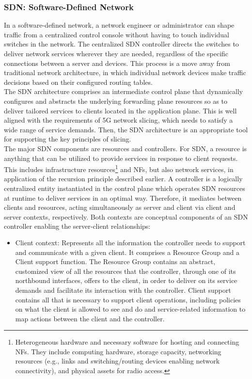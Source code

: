 \documentclass{report}
\begin{document}
\subsubsection{SDN: Software-Defined Network}
In a software-defined network, a network engineer or administrator can shape traffic from a centralized control console without having to touch individual switches in the network. The centralized SDN controller directs the switches to deliver network services wherever they are needed, regardless of the specific connections between a server and devices. This process is a move away from traditional network architecture, in which individual network devices make traffic decisions based on their configured routing tables.\\
The SDN architecture comprises an intermediate control plane that dynamically configures and abstracts the underlying
forwarding plane resources so as to deliver tailored services to clients located in the application plane. This is
well aligned with the requirements of 5G network
slicing, which needs to satisfy a wide range of service demands. Then, the SDN architecture is an appropriate
tool for supporting the key principles of slicing.\\
The major SDN components are resources and controllers. For
SDN, a resource is anything that can be utilized to
provide services in response to client requests. This
includes infrastructure resources\footnote{Heterogeneous hardware and necessary software for hosting and connecting NFs. They include computing hardware,
storage capacity, networking resources (e.g., links
and switching/routing devices enabling network
connectivity), and physical assets for radio access.
} and NFs, but also
network services, in application of the recursion
principle described earlier. A controller is a logically centralized entity instantiated in the control
plane which operates SDN resources at runtime
to deliver services in an optimal way. Therefore,
it mediates between clients and resources, acting simultaneously as server and client via client
and server contexts, respectively. Both contexts
are conceptual components of an SDN controller
enabling the server-client relationships:
\begin{itemize}
\item Client context: Represents all the information the
controller needs to support and communicate with
a given client. It comprises a Resource Group and
a Client support function. The Resource Group contains an abstract, customized view of all the resources that the controller, through one of its northbound
interfaces, offers to the client, in order to deliver
on its service demands and facilitate its interaction
with the controller. Client support contains all that
is necessary to support client operations, including
policies on what the client is allowed to see and do and service-related information to map actions
between the client and the controller.
\end{itemize}
\end{document}
